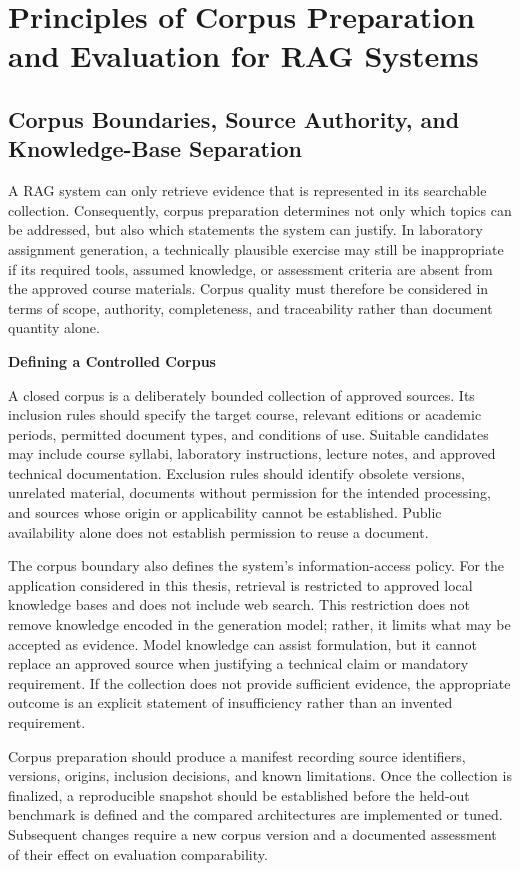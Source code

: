\documentclass[12pt,a4paper]{report}
\numberwithin{equation}{chapter}
\begin{document}
\chapter{Principles of Corpus Preparation and Evaluation for RAG Systems}
\section{Corpus Boundaries, Source Authority, and Knowledge-Base Separation}

A RAG system can only retrieve evidence that is represented in its searchable collection. Consequently, corpus preparation determines not only which topics can be addressed, but also which statements the system can justify. In laboratory assignment generation, a technically plausible exercise may still be inappropriate if its required tools, assumed knowledge, or assessment criteria are absent from the approved course materials. Corpus quality must therefore be considered in terms of scope, authority, completeness, and traceability rather than document quantity alone.

\par\medskip
\textbf{Defining a Controlled Corpus}

A closed corpus is a deliberately bounded collection of approved sources. Its inclusion rules should specify the target course, relevant editions or academic periods, permitted document types, and conditions of use. Suitable candidates may include course syllabi, laboratory instructions, lecture notes, and approved technical documentation. Exclusion rules should identify obsolete versions, unrelated material, documents without permission for the intended processing, and sources whose origin or applicability cannot be established. Public availability alone does not establish permission to reuse a document.

The corpus boundary also defines the system's information-access policy. For the application considered in this thesis, retrieval is restricted to approved local knowledge bases and does not include web search. This restriction does not remove knowledge encoded in the generation model; rather, it limits what may be accepted as evidence. Model knowledge can assist formulation, but it cannot replace an approved source when justifying a technical claim or mandatory requirement. If the collection does not provide sufficient evidence, the appropriate outcome is an explicit statement of insufficiency rather than an invented requirement.

Corpus preparation should produce a manifest recording source identifiers, versions, origins, inclusion decisions, and known limitations. Once the collection is finalized, a reproducible snapshot should be established before the held-out benchmark is defined and the compared architectures are implemented or tuned. Subsequent changes require a new corpus version and a documented assessment of their effect on evaluation comparability.
\end{document}
